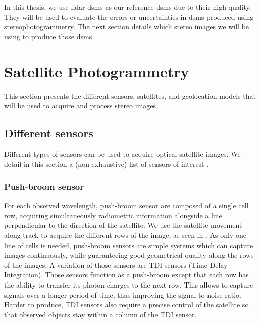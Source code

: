 In this thesis, we use \acrshort{lidar} \acrshort{dsm}s as our reference \acrshort{dsm}s due to their high quality. They will be used to evaluate the errors or uncertainties in \acrshort{dsm}s produced using stereophotogrammetry. The next section details which stereo images we will be using to produce those \acrshort{dsm}s. 

\section{Satellite Photogrammetry}\label{sec:co3d}
This section presents the different sensors, satellites, and geolocation models that will be used to acquire and process stereo images.

\subsection{Different sensors}
Different types of sensors can be used to acquire optical satellite images. We detail in this section a (non-exhaustive) list of sensors of interest \cite{cnes_imagerie_2008}.

\subsubsection{Push-broom sensor}
For each observed wavelength, push-broom sensor are composed of a single cell row, acquiring simultaneously radiometric information alongside a line perpendicular to the direction of the satellite. We use the satellite movement along track to acquire the different rows of the image, as seen in . As only one line of cells is needed, push-broom sensors are simple systems which can capture images continuously, while guaranteeing good geometrical quality along the rows of the images. A variation of those sensors are TDI sensors (Time Delay Integration). Those sensors function as a push-broom except that each row has the ability to transfer its photon charges to the next row. This allows to capture signals over a longer period of time, thus improving the signal-to-noise ratio. Harder to produce, TDI sensors also require a precise control of the satellite so that observed objects stay within a column of the TDI sensor. 

